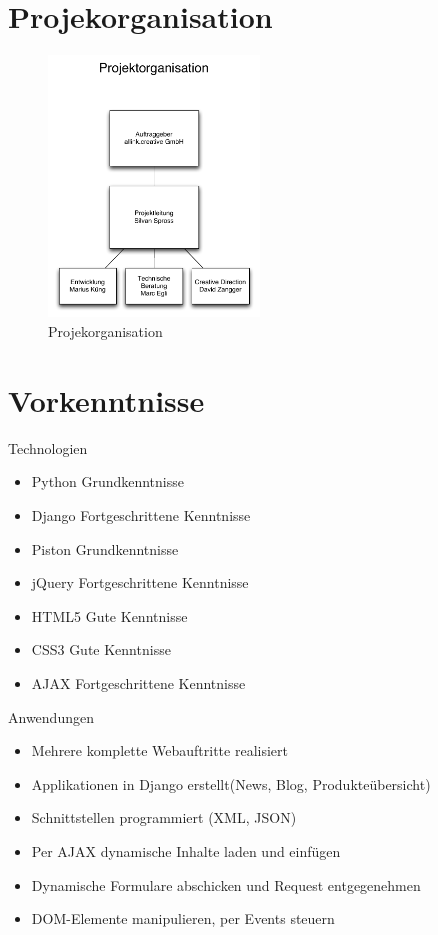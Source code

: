 \section{Projekorganisation}

\begin{figure}[!ht]
\begin{center}
\includegraphics[width=0.5\textwidth,angle=0]{./bilder/01_projektorganisation.pdf}
\caption[Projekorganisation]{Projekorganisation\footnotemark}
\end{center}
\end{figure}

\section{Vorkenntnisse}

Technologien
\begin{itemize}
    \item Python Grundkenntnisse
    \item Django Fortgeschrittene Kenntnisse
    \item Piston Grundkenntnisse
    \item jQuery Fortgeschrittene Kenntnisse
    \item HTML5 Gute Kenntnisse
    \item CSS3 Gute Kenntnisse
    \item AJAX Fortgeschrittene Kenntnisse
\end{itemize}

Anwendungen
\begin{itemize}
    \item Mehrere komplette Webauftritte realisiert
    \item Applikationen in Django erstellt(News, Blog, Produkteübersicht)
    \item Schnittstellen programmiert (XML, JSON)
    \item Per AJAX dynamische Inhalte laden und einfügen
    \item Dynamische Formulare abschicken und Request entgegenehmen
    \item DOM-Elemente manipulieren, per Events steuern
\end{itemize}
    
